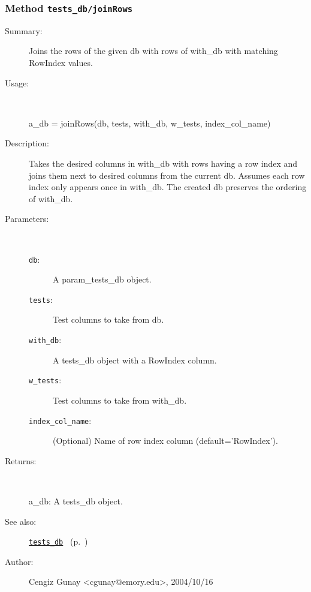 \subsubsection[Method \texttt{joinRows}]{Method \texttt{tests\_db/joinRows}}%
%
\label{ref_tests_db__joinRows}%
\hypertarget{ref_tests_db__joinRows}{}%
\begin{description}
\item[Summary:]Joins the rows of the given db with rows of with\_db with matching
  	RowIndex values.
%
\item[Usage:]~%
\begin{lyxcode}%
a\_db = joinRows(db, tests, with\_db, w\_tests, index\_col\_name)
%
\end{lyxcode}%
%
\item[Description:]%
Takes the desired columns in with\_db with rows having a 
 row index and joins them next to desired columns from the current db. 
 Assumes each row index only appears once in with\_db. The created
 db preserves the ordering of with\_db.
\item[Parameters:]~
\begin{description}%
\item[\texttt{db}:]
 A param\_tests\_db object.
\item[\texttt{tests}:]
 Test columns to take from db.
\item[\texttt{with\_db}:]
 A tests\_db object with a RowIndex column.
\item[\texttt{w\_tests}:]
 Test columns to take from with\_db.
\item[\texttt{index\_col\_name}:]
 (Optional) Name of row index column (default='RowIndex').
\end{description}%
%
\item[Returns:]~

	a\_db: A tests\_db object.
%
%
\item[See also:]%
\hyperlink{ref_tests_db}{\texttt{tests\_db}}%
\ (p.~\pageref{ref_tests_db})%
%
%
\item[Author:]%
Cengiz Gunay <cgunay@emory.edu>, 2004/10/16%
\end{description}
\methodline%
